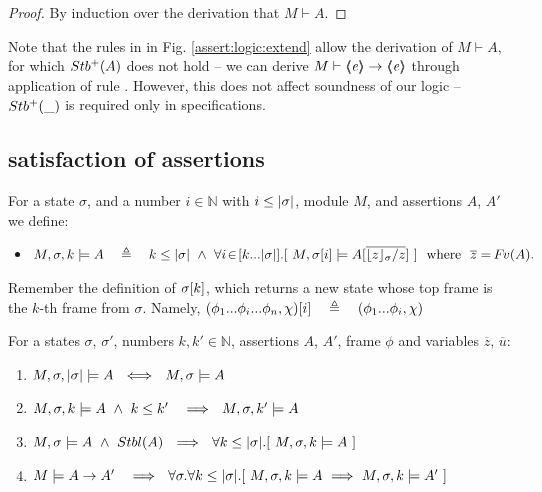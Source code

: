 \begin{proof}
By induction over the derivation that $M \vdash A$.
\end{proof}

Note that the rules in  in Fig.  \ref{assert:logic:extend} allow the derivation  of $M\vdash A$, 
for which ${Stb^+( A )}$ does not hold -- \eg we can derive  $M \vdash \inside {\re}  \rightarrow  \inside{\re}$ through application of rule {}.
However, this does not affect soundness of our logic --    ${Stb^+( \_ )}$ is required only in specifications.

\subsection{\Strong satisfaction of assertions}
\label{s:scoped:mean}

\begin{definition}%
\label{def:restrict}
For a state $\sigma$, and a number $i\in \mathbb{N}$ with $i \leq |\sigma|$,   module $M$, and assertions $A$, $A'$ we define: %
\begin{itemize}
\item
$  \satDAssertFrom M  \sigma k   A  \ \  \ \triangleq \  \ \  
  k\leq  \DepthSt {\sigma} \ \wedge \  \forall i\!\in\![k...\DepthSt {\sigma}].[\ M,{\RestictTo {\sigma}{i}} \models A[\overline{ {{\interpret \sigma z}/ z}}]\ ] \ \  \mbox{where} \ \
  \overline z=\fv(A).$ 
\end{itemize}
\end{definition}
 
 Remember the definition of  $\sigma[k]$, which returns a new state whose top frame is the $k$-th frame from $\sigma$. Namely, $\RestictTo {(\phi_1...\phi_i...\phi_n,\chi)} {i}\ \ \ \triangleq \ \ \ (\phi_1...\phi_i,\chi)$
  
 
\begin{lemma}
\label{l:shallow:scoped}
For a states $\sigma$, $\sigma'$, numbers $k,k'\in \mathbb{N}$, assertions  $A$, $A'$, frame $\phi$ and variables $\overline z$, $\overline u$:
\begin{enumerate}
\item
$ \satDAssertFrom M  \sigma { \DepthSt \sigma}   A \ \ \Longleftrightarrow\ \ M,\sigma \models A\ $
\item
$ \satDAssertFrom M  \sigma {k} A \ \wedge\  k\leq k'\  \  \   \Longrightarrow \ \ \satDAssertFrom M  \sigma {k'} A$ 
\item 
\label{shallow:to:scoped}
$ M,\sigma \models A \ \wedge\ \Stable A \  \ \Longrightarrow \  \  \forall k  \leq  \DepthSt \sigma.[ \ \satDAssertFrom M  \sigma k   A \ ]$
\item
\label{fourSD}
$ M  \models A \rightarrow A'\  \  \   \Longrightarrow \ \ \forall \sigma. \forall k\leq  { \DepthSt \sigma}.[ \ \satDAssertFrom M  \sigma {k} A
\ \Longrightarrow \  \satDAssertFrom M  \sigma {k} A'\ ]$

\end{enumerate}
\end{lemma}
 
